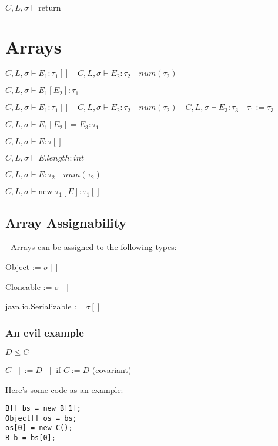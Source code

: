 \documentclass[12pt]{article}
\begin{document}
$C,L,\sigma \vdash \text{return}$ 

\section{Arrays}

\underline{$C,L,\sigma \vdash E_1 : \tau_1[] \quad C,L,\sigma \vdash E_2 : \tau_2 \quad num(\tau_2)$}

$C,L,\sigma \vdash E_1[E_2] : \tau_1$ 
\newline

\underline{$C,L,\sigma \vdash E_1 : \tau_1[] \quad C,L,\sigma \vdash E_2 : \tau_2 \quad num(\tau_2) \quad C,L,\sigma \vdash E_3 : \tau_3 \quad \tau_1 := \tau_3$}

$C,L,\sigma \vdash E_1[E_2]  = E_3 : \tau_1$ 
\newline

\underline{$C,L,\sigma \vdash E : \tau[]$}

$C,L,\sigma \vdash E.length : int$ 
\newline

\underline{$C,L,\sigma \vdash E : \tau_2 \quad num(\tau_2)$}

$C,L,\sigma \vdash \text{new } \tau_1[E] : \tau_1[]$ 

\subsection{Array Assignability}

- Arrays can be assigned to the following types:

Object := $\sigma[]$

Cloneable := $\sigma[]$

java.io.Serializable := $\sigma[]$
\newline

\subsubsection{An evil example}

\underline{$D \leq C$}

$C[] := D[] \text{ if } C := D$ (covariant)
\newline

Here's some code as an example:
\newline

\begin{verbatim}
B[] bs = new B[1];
Object[] os = bs;
os[0] = new C();
B b = bs[0];
\end{verbatim}
\end{document}
